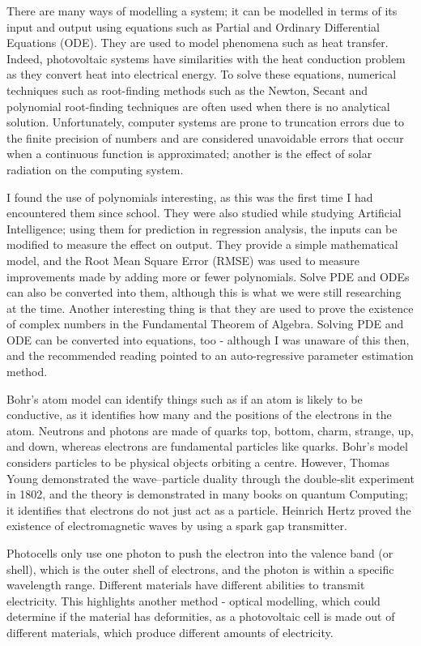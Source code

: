 \documentclass{article}
\begin{document}
There are many ways of modelling a system; it can be modelled in terms of its input and output using equations such as Partial and Ordinary Differential Equations (ODE). They are used to model phenomena such as heat transfer. Indeed, photovoltaic systems have similarities with the heat conduction problem as they convert heat into electrical energy. To solve these equations, numerical techniques such as root-finding methods such as the Newton, Secant and polynomial root-finding techniques are often used when there is no analytical solution. Unfortunately, computer systems are prone to truncation errors due to the finite precision of numbers and are considered unavoidable errors that occur when a continuous function is approximated; another is the effect of solar radiation on the computing system. 

I found the use of polynomials interesting, as this was the first time I had encountered them since school. They were also studied while studying Artificial Intelligence; using them for prediction in regression analysis, the inputs can be modified to measure the effect on output. They provide a simple mathematical model, and the Root Mean Square Error (RMSE) was used to measure improvements made by adding more or fewer polynomials. Solve PDE and ODEs can also be converted into them, although this is what we were still researching at the time. Another interesting thing is that they are used to prove the existence of complex numbers in the Fundamental Theorem of Algebra. Solving PDE and ODE can be converted into equations, too - although I was unaware of this then, and the recommended reading pointed to an auto-regressive parameter estimation method.

Bohr's atom model can identify things such as if an atom is likely to be conductive, as it identifies how many and the positions of the electrons in the atom. Neutrons and photons are made of quarks top, bottom, charm, strange, up, and down, whereas electrons are fundamental particles like quarks. Bohr's model considers particles to be physical objects orbiting a centre. However, Thomas Young demonstrated the wave–particle duality through the double‐slit experiment in 1802, and the theory is demonstrated in many books on quantum Computing; it identifies that electrons do not just act as a particle. Heinrich Hertz proved the existence of electromagnetic waves by using a spark gap transmitter. 

Photocells only use one photon to push the electron into the valence band (or shell), which is the outer shell of electrons, and the photon is within a specific wavelength range. Different materials have different abilities to transmit electricity. This highlights another method - optical modelling, which could determine if the material has deformities, as a photovoltaic cell is made out of different materials, which produce different amounts of electricity. 
\end{document}
